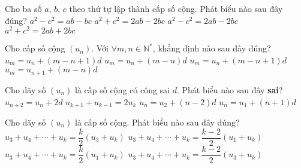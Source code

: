 \begin{ex}%
	Cho ba số $a$, $b$, $c$ theo thứ tự lập thành cấp số cộng. Phát biểu nào sau đây đúng?
	\choice
	{$a^2-c^2=ab-bc$}
	{$a^2+c^2=2ab-2bc$}
	{\True $a^2-c^2=2ab-2bc$}
	{$a^2+c^2=2ab+2bc$}
\end{ex}

\begin{ex}%
	Cho cấp số cộng $(u_n)$. Với $\forall m, n \in \mathbb{N^*}$, khẳng định nào sau đây đúng?	
	\choice
	{$u_m=u_n+(m-n+1)d$}
	{\True $u_m=u_n+(m-n)d$}
	{$u_m=u_n+(m-n+1)d$}
	{$u_m=u_{n+1}+(m-n)d$}
\end{ex}

\begin{ex}%
	Cho dãy số $(u_n)$ là cấp số cộng có công sai $d$. Phát biểu nào sau đây \textbf{sai}?
	\choice
	{$u_{n+2} = u_n +2d$}
	{$u_{k+1} + u_{k-1} =2u_k$}
	{$u_n = u_2 +(n-2)d$}
	{\True $u_n = u_1 +(n+1)d$}
\end{ex}

\begin{ex}%
	Cho dãy số $(u_n)$ là cấp số cộng. Phát biểu nào sau đây đúng?
	\choice
	{$u_3+u_4+ \cdots +u_k = \dfrac{k}{2} (u_3 +u_k)$}
	{$u_3+u_4+ \cdots +u_k = \dfrac{k-2}{2} (u_1 +u_k)$}
	{$u_3+u_4+ \cdots +u_k = \dfrac{k}{2} (u_1 +u_k)$}
	{\True $u_3+u_4+ \cdots +u_k = \dfrac{k-2}{2} (u_3 +u_k)$}
\end{ex}

